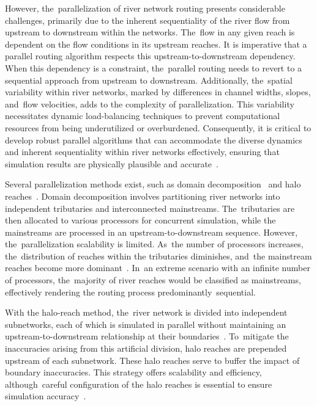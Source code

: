 \documentclass[water,article,accept,pdftex,moreauthors]{Definitions/mdpi}
\begin{document}
However, the~parallelization of river network routing presents considerable challenges, primarily due to the inherent sequentiality of the river flow from upstream to downstream within the networks. The~flow in any given reach is dependent on the flow conditions in its upstream reaches. It is imperative that a parallel routing algorithm respects this upstream-to-downstream dependency. When this dependency is a constraint, the~parallel routing needs to revert to a sequential approach from upstream to downstream. Additionally, the~spatial variability within river networks, marked by differences in channel widths, slopes, and~flow velocities, adds to the complexity of parallelization. This variability necessitates dynamic load-balancing techniques to prevent computational resources from being underutilized or overburdened. Consequently, it is critical to develop robust parallel algorithms that can accommodate the diverse dynamics and inherent sequentiality within river networks effectively, ensuring that simulation results are physically plausible and accurate~\cite{david2013WRR, mizukami2021JAMES, liu2014EMS, liu2023JH}.

Several parallelization methods exist, such as domain decomposition~\cite{mizukami2021JAMES, liu2023JH} and halo reaches~\cite{david2013WRR}. Domain decomposition involves partitioning river networks into independent tributaries and interconnected mainstreams. The~tributaries are then allocated to various processors for concurrent simulation, while the mainstreams are processed in an upstream-to-downstream sequence. However, the~parallelization scalability is limited. As~the number of processors increases, the~distribution of reaches within the tributaries diminishes, and~the mainstream reaches become more dominant~\cite{mizukami2021JAMES}. In~an extreme scenario with an infinite number of processors, the~majority of river reaches would be classified as mainstreams, effectively rendering the routing process predominantly~sequential.

With the halo-reach method, the~river network is divided into independent subnetworks, each of which is simulated in parallel without maintaining an upstream-to-downstream relationship at their boundaries~\cite{david2015WRR}. To~mitigate the inaccuracies arising from this artificial division, halo reaches are prepended upstream of each subnetwork. These halo reaches serve to buffer the impact of boundary inaccuracies. This strategy offers scalability and efficiency, although~careful configuration of the halo reaches is essential to ensure simulation accuracy~\cite{david2013WRR}.
\end{document}
